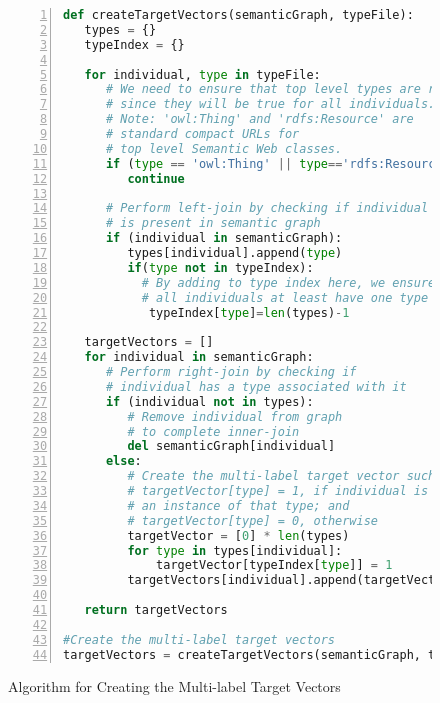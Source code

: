 \documentclass[runningheads,a4paper]{llncs}
\begin{document}
\begin{figure}
\begin{lstlisting}[language=Python,numbers=left, stepnumber=1, frame=single]
def createTargetVectors(semanticGraph, typeFile):
   types = {}
   typeIndex = {}

   for individual, type in typeFile:
      # We need to ensure that top level types are removed, 
      # since they will be true for all individuals.
      # Note: 'owl:Thing' and 'rdfs:Resource' are 
      # standard compact URLs for 
      # top level Semantic Web classes.
      if (type == 'owl:Thing' || type=='rdfs:Resource'):
         continue
      
      # Perform left-join by checking if individual 
      # is present in semantic graph
      if (individual in semanticGraph):
         types[individual].append(type)
         if(type not in typeIndex):
           # By adding to type index here, we ensure that 
           # all individuals at least have one type
            typeIndex[type]=len(types)-1

   targetVectors = []
   for individual in semanticGraph:
      # Perform right-join by checking if 
      # individual has a type associated with it
      if (individual not in types):
         # Remove individual from graph
         # to complete inner-join
         del semanticGraph[individual]
      else:
         # Create the multi-label target vector such that
         # targetVector[type] = 1, if individual is 
         # an instance of that type; and 
         # targetVector[type] = 0, otherwise
         targetVector = [0] * len(types)
         for type in types[individual]:
             targetVector[typeIndex[type]] = 1
         targetVectors[individual].append(targetVector)

   return targetVectors

#Create the multi-label target vectors
targetVectors = createTargetVectors(semanticGraph, typeFile)
\end{lstlisting}
\caption{Algorithm for Creating the Multi-label Target Vectors}
\label{createTargetVectors}
\end{figure}
\end{document}
